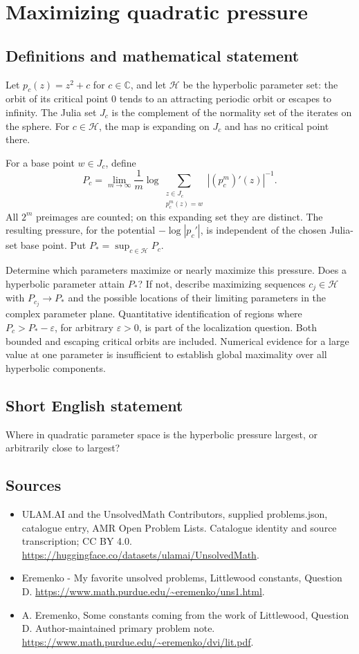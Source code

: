 \documentclass[11pt,a4paper]{article}
\begin{document}
\section*{Maximizing quadratic pressure}\label{statement}

\subsection{Definitions and mathematical statement}
Let $p_c(z)=z^2+c$ for $c\in\mathbb C$, and
let $\mathcal H$ be the hyperbolic parameter set:
the orbit of its critical point $0$ tends to
an attracting periodic orbit or escapes to infinity.
The Julia set $J_c$ is the complement of the
normality set of the iterates on the sphere.
For $c\in\mathcal H$, the map is expanding on
$J_c$ and has no critical point there.

For a base point $w\in J_c$, define
\[
 P_c=\lim_{m\to\infty}\frac1m\log
       \sum_{\substack{z\in J_c\\p_c^m(z)=w}}
                            |(p_c^m)'(z)|^{-1}.
\]
All $2^m$ preimages are counted; on this expanding
set they are distinct. The resulting pressure,
for the potential $-\log|p_c'|$, is independent
of the chosen Julia-set base point. Put
$P_*=\sup_{c\in\mathcal H}P_c$.

Determine which parameters maximize or nearly maximize
this pressure. Does a hyperbolic parameter attain
$P_*$? If not, describe maximizing sequences
$c_j\in\mathcal H$ with $P_{c_j}\to P_*$
and the possible locations of their limiting
parameters in the complex parameter plane.
Quantitative identification of regions where
$P_c>P_*-\varepsilon$, for arbitrary
$\varepsilon>0$, is part of the localization
question.
Both bounded and escaping critical orbits are
included. Numerical evidence for a large value
at one parameter is insufficient to establish
global maximality over all hyperbolic components.
\subsection{Short English statement}
Where in quadratic parameter space is the hyperbolic pressure largest, or arbitrarily close to largest?
\subsection{Sources}
\begin{itemize}
\item[S1] ULAM.AI and the UnsolvedMath Contributors, supplied problems.json, catalogue entry, AMR Open Problem Lists. Catalogue identity and source transcription; CC BY 4.0.
\url{https://huggingface.co/datasets/ulamai/UnsolvedMath}.
\item[S2] Eremenko - My favorite unsolved problems, Littlewood constants, Question D. 
\url{https://www.math.purdue.edu/~eremenko/uns1.html}.
\item[S3] A. Eremenko, Some constants coming from the work of Littlewood, Question D. Author-maintained primary problem note.
\url{https://www.math.purdue.edu/~eremenko/dvi/lit.pdf}.
\end{itemize}
\end{document}
